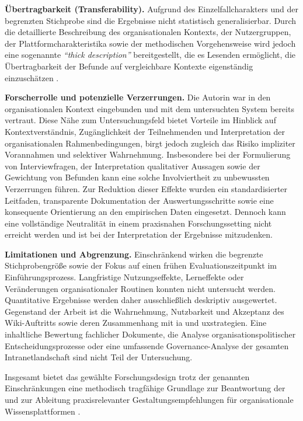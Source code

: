 \textbf{Übertragbarkeit (Transferability).}  
Aufgrund des Einzelfallcharakters und der begrenzten Stichprobe sind die Ergebnisse nicht statistisch generalisierbar. Durch die detaillierte Beschreibung des organisationalen Kontexts, der Nutzergruppen, der Plattformcharakteristika sowie der methodischen Vorgehensweise wird jedoch eine sogenannte \textit{\enquote{thick description}} bereitgestellt, die es Lesenden ermöglicht, die Übertragbarkeit der Befunde auf vergleichbare Kontexte eigenständig einzuschätzen \cite{422:Flick2018,123:PracticalGuidance2017}.

\textbf{Forscherrolle und potenzielle Verzerrungen.}  
Die Autorin war in den organisationalen Kontext eingebunden und mit dem untersuchten System bereits vertraut. Diese Nähe zum Untersuchungsfeld bietet Vorteile im Hinblick auf Kontextverständnis, Zugänglichkeit der Teilnehmenden und Interpretation der organisationalen Rahmenbedingungen, birgt jedoch zugleich das Risiko impliziter Vorannahmen und selektiver Wahrnehmung. Insbesondere bei der Formulierung von Interviewfragen, der Interpretation qualitativer Aussagen sowie der Gewichtung von Befunden kann eine solche Involviertheit zu unbewussten Verzerrungen führen. Zur Reduktion dieser Effekte wurden ein standardisierter Leitfaden, transparente Dokumentation der Auswertungsschritte sowie eine konsequente Orientierung an den empirischen Daten eingesetzt. Dennoch kann eine vollständige Neutralität in einem praxisnahen Forschungssetting nicht erreicht werden und ist bei der Interpretation der Ergebnisse mitzudenken.

\textbf{Limitationen und Abgrenzung.}  
Einschränkend wirken die begrenzte Stichprobengröße sowie der Fokus auf einen frühen Evaluationszeitpunkt im Einführungsprozess. Langfristige Nutzungseffekte, Lerneffekte oder Veränderungen organisationaler Routinen konnten nicht untersucht werden. Quantitative Ergebnisse werden daher ausschließlich deskriptiv ausgewertet. Gegenstand der Arbeit ist die Wahrnehmung, Nutzbarkeit und Akzeptanz des Wiki-Auftritts sowie deren Zusammenhang mit \Gls{ia} und \Gls{uxstrategien}. Eine inhaltliche Bewertung fachlicher Dokumente, die Analyse organisationspolitischer Entscheidungsprozesse oder eine umfassende Governance-Analyse der gesamten Intranetlandschaft sind nicht Teil der Untersuchung.

Insgesamt bietet das gewählte Forschungsdesign trotz der genannten Einschränkungen eine methodisch tragfähige Grundlage zur Beantwortung der  und zur Ableitung praxisrelevanter Gestaltungsempfehlungen für organisationale Wissensplattformen \cite{422:Flick2018,423:LincolnGuba1985}.
